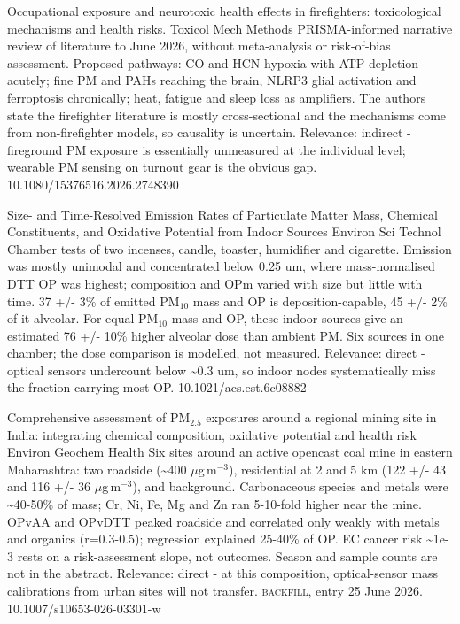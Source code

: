 \documentclass[10pt]{article}
\begin{document}
\par{}\baselineskip{}\baselineskip
{}

{Occupational exposure and neurotoxic health effects in firefighters: toxicological mechanisms and health risks.}
{Toxicol Mech Methods}
{PRISMA-informed narrative review of literature to June 2026, without meta-analysis or risk-of-bias assessment. Proposed pathways: CO and HCN hypoxia with ATP depletion acutely; fine PM and PAHs reaching the brain, NLRP3 glial activation and ferroptosis chronically; heat, fatigue and sleep loss as amplifiers. The authors state the firefighter literature is mostly cross-sectional and the mechanisms come from non-firefighter models, so causality is uncertain. Relevance: indirect - fireground PM exposure is essentially unmeasured at the individual level; wearable PM sensing on turnout gear is the obvious gap.}
{10.1080/15376516.2026.2748390}

{Size- and Time-Resolved Emission Rates of Particulate Matter Mass, Chemical Constituents, and Oxidative Potential from Indoor Sources}
{Environ Sci Technol}
{Chamber tests of two incenses, candle, toaster, humidifier and cigarette. Emission was mostly unimodal and concentrated below 0.25 um, where mass-normalised DTT OP was highest; composition and OPm varied with size but little with time. 37 +/- 3\% of emitted PM$_{10}$ mass and OP is deposition-capable, 45 +/- 2\% of it alveolar. For equal PM$_{10}$ mass and OP, these indoor sources give an estimated 76 +/- 10\% higher alveolar dose than ambient PM. Six sources in one chamber; the dose comparison is modelled, not measured. Relevance: direct - optical sensors undercount below \textasciitilde{}0.3 um, so indoor nodes systematically miss the fraction carrying most OP.}
{10.1021/acs.est.6c08882}

{Comprehensive assessment of PM$_{2.5}$ exposures around a regional mining site in India: integrating chemical composition, oxidative potential and health risk}
{Environ Geochem Health}
{Six sites around an active opencast coal mine in eastern Maharashtra: two roadside (\textasciitilde{}400 $\mu$g\,m$^{-3}$), residential at 2 and 5 km (122 +/- 43 and 116 +/- 36 $\mu$g\,m$^{-3}$), and background. Carbonaceous species and metals were \textasciitilde{}40-50\% of mass; Cr, Ni, Fe, Mg and Zn ran 5-10-fold higher near the mine. OPvAA and OPvDTT peaked roadside and correlated only weakly with metals and organics (r=0.3-0.5); regression explained 25-40\% of OP. EC cancer risk \textasciitilde{}1e-3 rests on a risk-assessment slope, not outcomes. Season and sample counts are not in the abstract. Relevance: direct - at this composition, optical-sensor mass calibrations from urban sites will not transfer. \textsc{backfill}, entry 25 June 2026.}
{10.1007/s10653-026-03301-w}
\end{document}

